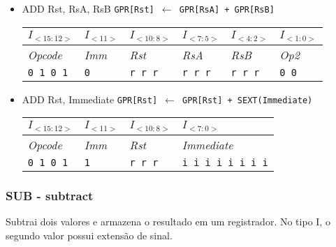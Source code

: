 \documentclass{extreport}
\begin{document}
\begin{itemize}
\item ADD Rst, RsA, RsB
\subitem \texttt{GPR[Rst] $\leftarrow$ GPR[RsA] + GPR[RsB]}
\begin{table}[ht!]
\centering
\begin{tabular}{|p{1.6cm}|p{1.6cm}|p{1.6cm}|p{1.6cm}|p{1.6cm}|p{1.6cm}|}
\hline
$I_{<15:12>}$ & $I_{<11>}$ & $I_{<10:8>}$ & $I_{<7:5>}$ & $I_{<4:2>}$ & $I_{<1:0>}$ \\ \hline
\textit{Opcode} & \textit{Imm} & \textit{Rst} & \textit{RsA} & \textit{RsB} & \textit{Op2} \\ \hline
\texttt{0 1 0 1} & \texttt{0} & \texttt{r r r} & \texttt{r r r} & \texttt{r r r} & \texttt{0 0} \\ \hline
\end{tabular}
\end{table}

\item ADD Rst, Immediate
\subitem \texttt{GPR[Rst] $\leftarrow$ GPR[Rst] + SEXT(Immediate)}
\begin{table}[ht!]
\centering
\begin{tabular}{|p{1.6cm}|p{1.6cm}|p{1.6cm}|p{5.65cm}|}
\hline
$I_{<15:12>}$ & $I_{<11>}$ & $I_{<10:8>}$ & $I_{<7:0>}$ \\ \hline
\textit{Opcode} & \textit{Imm} & \textit{Rst} & \textit{Immediate} \\ \hline
\texttt{0 1 0 1} & \texttt{1} & \texttt{r r r} & \texttt{i i i i i i i i} \\ \hline
\end{tabular}
\end{table}
\end{itemize}

\subsubsection{SUB - subtract}
Subtrai dois valores e armazena o resultado em um registrador. No tipo I, o segundo valor possui extensão de sinal.
\end{document}
